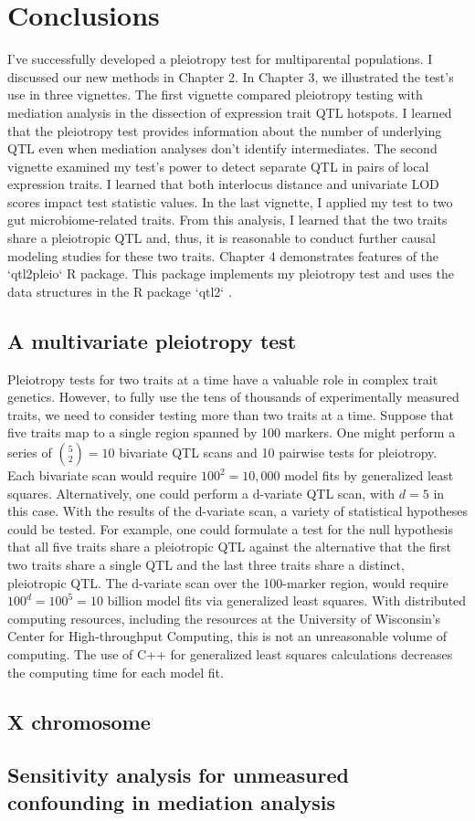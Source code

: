\chapter{Conclusions}

I've successfully developed a pleiotropy test for multiparental populations.
I discussed our new methods in Chapter 2.
In Chapter 3, we illustrated the test's use in three vignettes.
The first vignette compared pleiotropy testing with mediation analysis
in the dissection of expression trait QTL hotspots.
I learned that the pleiotropy test provides information about the
number of underlying QTL even when mediation analyses don't identify intermediates. 
The second vignette examined my test's power to detect separate QTL
in pairs of local expression traits.
I learned that both interlocus distance and univariate LOD scores
impact test statistic values. 
In the last vignette, I applied my test to two gut microbiome-related traits.
From this analysis, I learned that the two traits share a pleiotropic QTL and, thus,
it is reasonable to conduct further causal modeling studies for these two traits.
Chapter 4 demonstrates features of the `qtl2pleio` R package.
This package implements my pleiotropy test and uses the data structures in the R package `qtl2` \citep{broman2019rqtl2}.

\section{A multivariate pleiotropy test}

Pleiotropy tests for two traits at a time have a valuable role in complex trait genetics. However, to fully use the tens of thousands of experimentally measured traits, we need to consider testing more than two traits at a time. Suppose that five traits map to a single region spanned by 100 markers. One might perform a series of $\binom{5}{2} = 10$ bivariate QTL scans and 10 pairwise tests for pleiotropy. Each bivariate scan would require $100^2 = 10,000$ model fits by generalized least squares. Alternatively, one could perform a d-variate QTL scan, with $d=5$ in this case. With the results of the d-variate scan, a variety of statistical hypotheses could be tested. For example, one could formulate a test for the null hypothesis that all five traits share a pleiotropic QTL against the alternative that the first two traits share a single QTL and the last three traits share a distinct, pleiotropic QTL. The d-variate scan over the 100-marker region, would require $100^d = 100^5 = 10$ billion model fits via generalized least squares. With distributed computing resources, including the resources at the University of Wisconsin's Center for High-throughput Computing, this is not an unreasonable volume of computing. The use of C++ for generalized least squares calculations decreases the computing time for each model fit. 

\section{X chromosome}



\section{Sensitivity analysis for unmeasured confounding in mediation analysis}


